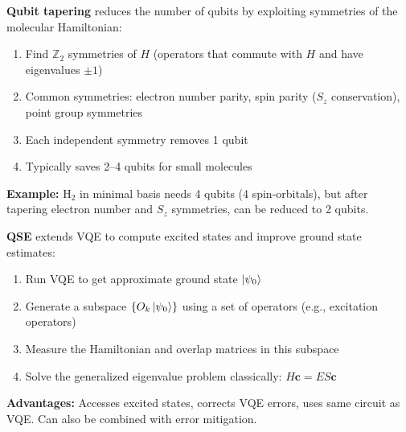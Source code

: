 \documentclass[11pt,a4paper]{article}
\begin{document}
\begin{answerbox}
\textbf{Qubit tapering} reduces the number of qubits by exploiting symmetries of the molecular Hamiltonian:
\begin{enumerate}
    \item Find $\mathbb{Z}_2$ symmetries of $H$ (operators that commute with $H$ and have eigenvalues $\pm 1$)
    \item Common symmetries: electron number parity, spin parity ($S_z$ conservation), point group symmetries
    \item Each independent symmetry removes 1 qubit
    \item Typically saves 2--4 qubits for small molecules
\end{enumerate}
\textbf{Example:} H$_2$ in minimal basis needs 4 qubits (4 spin-orbitals), but after tapering electron number and $S_z$ symmetries, can be reduced to 2 qubits.
\end{answerbox}

\begin{answerbox}
\textbf{QSE} extends VQE to compute excited states and improve ground state estimates:
\begin{enumerate}
    \item Run VQE to get approximate ground state $\ket{\psi_0}$
    \item Generate a subspace $\{ O_k \ket{\psi_0} \}$ using a set of operators (e.g., excitation operators)
    \item Measure the Hamiltonian and overlap matrices in this subspace
    \item Solve the generalized eigenvalue problem classically: $H\mathbf{c} = ES\mathbf{c}$
\end{enumerate}
\textbf{Advantages:} Accesses excited states, corrects VQE errors, uses same circuit as VQE. Can also be combined with error mitigation.
\end{answerbox}
\end{document}
